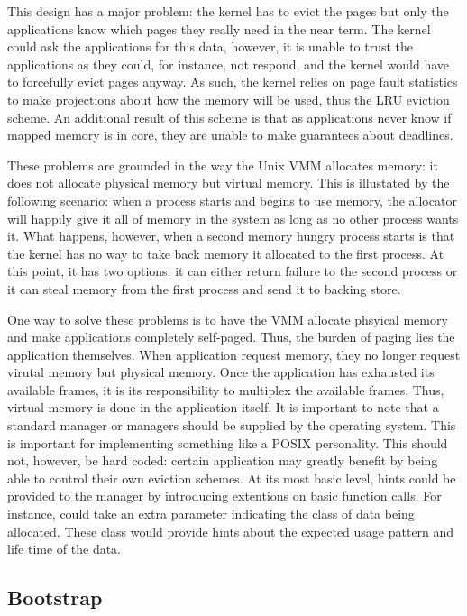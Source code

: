 This design has a major problem: the kernel has to evict the pages but
only the applications know which pages they really need in the near
term.  The kernel could ask the applications for this data, however,
it is unable to trust the applications as they could, for instance,
not respond, and the kernel would have to forcefully evict pages
anyway.  As such, the kernel relies on page fault statistics to make
projections about how the memory will be used, thus the LRU eviction
scheme.  An additional result of this scheme is that as applications
never know if mapped memory is in core, they are unable to make
guarantees about deadlines.

These problems are grounded in the way the Unix VMM allocates memory:
it does not allocate physical memory but virtual memory.  This is
illustated by the following scenario: when a process starts and begins
to use memory, the allocator will happily give it all of memory in the
system as long as no other process wants it.  What happens, however,
when a second memory hungry process starts is that the kernel has no
way to take back memory it allocated to the first process.  At this
point, it has two options: it can either return failure to the second
process or it can steal memory from the first process and send it to
backing store.

One way to solve these problems is to have the VMM allocate phsyical
memory and make applications completely self-paged.  Thus, the burden
of paging lies the application themselves.  When application request
memory, they no longer request virutal memory but physical memory.
Once the application has exhausted its available frames, it is its
responsibility to multiplex the available frames.  Thus, virtual
memory is done in the application itself.  It is important to note
that a standard manager or managers should be supplied by the
operating system.  This is important for implementing something like a
POSIX personality.  This should not, however, be hard coded: certain
application may greatly benefit by being able to control their own
eviction schemes.  At its most basic level, hints could be provided to
the manager by introducing extentions on basic function calls.  For
instance,  could take an extra parameter indicating
the class of data being allocated.  These class would provide hints
about the expected usage pattern and life time of the data.

\subsection{Bootstrap}

